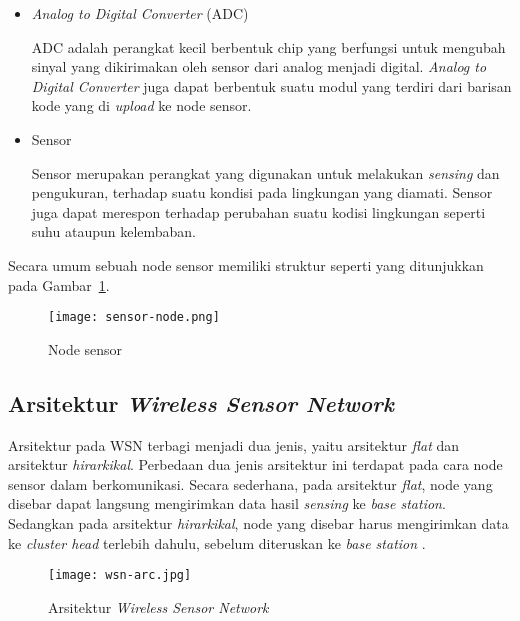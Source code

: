 \begin{itemize}
    \item \textit{Analog to Digital Converter} (ADC)
    
    ADC adalah perangkat kecil berbentuk chip yang berfungsi untuk mengubah sinyal yang dikirimakan oleh sensor dari analog menjadi digital. \textit{Analog to Digital Converter} juga dapat berbentuk suatu modul yang terdiri dari barisan kode yang di \textit{upload} ke node sensor.
    
    \item Sensor
    
    Sensor merupakan perangkat yang digunakan untuk melakukan \textit{sensing} dan pengukuran, terhadap suatu kondisi pada lingkungan yang diamati. Sensor juga dapat merespon terhadap perubahan suatu kodisi lingkungan seperti suhu ataupun kelembaban.
\end{itemize}

Secara umum sebuah node sensor memiliki struktur seperti yang ditunjukkan pada Gambar~\ref{fig:Node sensor}.

    \begin{figure}[H]
    	\centering  
    	\texttt{[image: sensor-node.png]}  
    	\caption[Node sensor]{Node sensor} 
    	\label{fig:Node sensor} 
    \end{figure} 

\subsection{Arsitektur \textit{Wireless Sensor Network}} \label{Arsitektur WSN}
Arsitektur pada WSN terbagi menjadi dua jenis, yaitu arsitektur \textit{flat} dan arsitektur \textit{hirarkikal}. Perbedaan dua jenis arsitektur ini terdapat pada cara node sensor dalam berkomunikasi. Secara sederhana, pada arsitektur \textit{flat}, node yang disebar dapat langsung mengirimkan data hasil \textit{sensing} ke \textit{base station}. Sedangkan pada arsitektur \textit{hirarkikal}, node yang disebar harus mengirimkan data ke \textit{cluster head} terlebih dahulu, sebelum diteruskan ke \textit{base station} \cite{ivan:20:wsn}.

    \begin{figure}[H]
    	\centering  
    	\texttt{[image: wsn-arc.jpg]}  
    	\caption[Arsitektur \textit{Wireless Sensor Network}]{Arsitektur \textit{Wireless Sensor Network}} 
    	\label{fig:Arsitektur Wireless Sensor Network} 
    \end{figure} 

